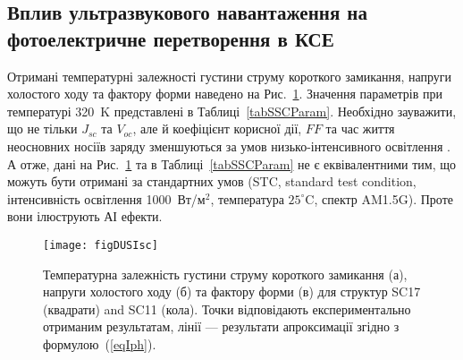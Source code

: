 \subsection{Вплив ультразвукового навантаження на фотоелектричне перетворення в КСЕ}

Отримані температурні залежності густини струму короткого замикання, напруги холостого ходу та фактору форми наведено на Рис.~\ref{figDUSIsc}.
Значення параметрів при температурі 320~K представлені в Таблиці~\ref{tabSSCParam}.
Необхідно зауважити, що не тільки $J_{sc}$ та $V_{oc}$, але й коефіцієнт корисної дії, $F\!F$ та час життя неосновних носіїв
заряду зменшуються за умов низько-інтенсивного освітлення \cite{LI:Ruhle,LI:Reich,LI:lifetime}.
А отже, дані на Рис.~\ref{figDUSIsc} та в Таблиці~\ref{tabSSCParam} не є еквівалентними тим, що
можуть бути отримані за стандартних умов (STC, standard test condition, інтенсивність освітлення 1000~Вт/м$^2$,
температура $25^{\circ}$C, спектр AM1.5G).
Проте вони ілюструють АІ ефекти.


\begin{figure}
\center
\texttt{[image: figDUSIsc]}%
\caption{\label{figDUSIsc}
Температурна залежність густини струму короткого замикання (а),
напруги холостого ходу (б) та
фактору форми (в)
для структур SC17 (квадрати) and SC11 (кола).
\FigCaptionSSC
Точки відповідають експериментально отриманим результатам,
лінії --- результати апроксимації згідно з формулою~(\ref{eqIph}).
}%
\end{figure}


